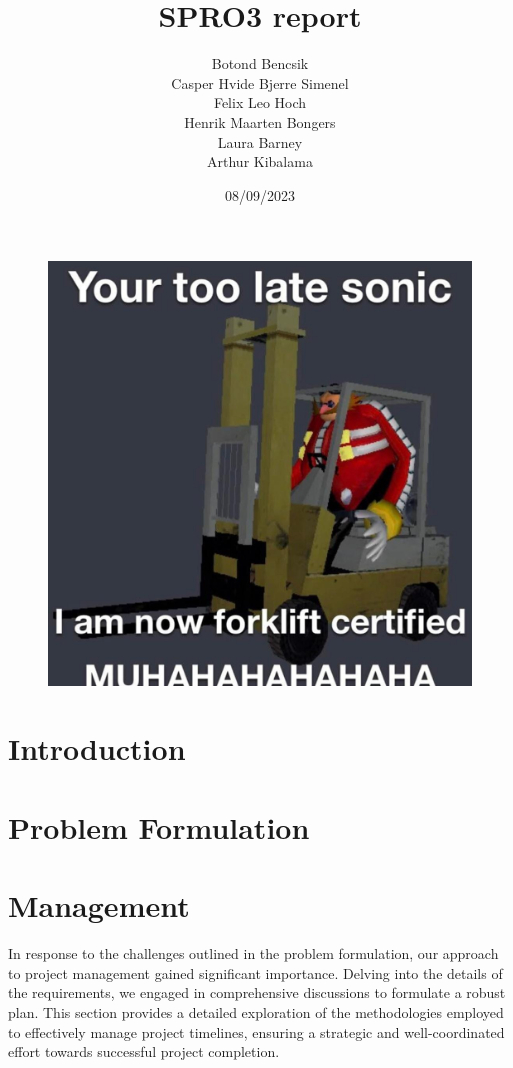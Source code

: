 \documentclass[11pt,table]{article}
\title{SPRO3 report}
\date{08/09/2023}
\author{Botond Bencsik\\Casper Hvide Bjerre Simenel\\Felix Leo Hoch\\Henrik Maarten Bongers\\Laura Barney\\Arthur Kibalama}
\begin{document}
\maketitle
\begin{figure}[H]
    \includegraphics[width=\textwidth]{forklift_m.jpg}
\end{figure}
\newpage
\tableofcontents
\newpage
\section{Introduction}
      
\section{Problem Formulation}
    
    
    

    
    
\section{Management}
    In response to the challenges outlined in the problem formulation, our approach
    to project management gained significant importance. Delving into the details
    of the requirements, we engaged in comprehensive discussions to formulate a
    robust plan. This section provides a detailed exploration of the methodologies
    employed to effectively manage project timelines, ensuring a strategic and
    well-coordinated effort towards successful project completion.
    
    
    
\end{document}
